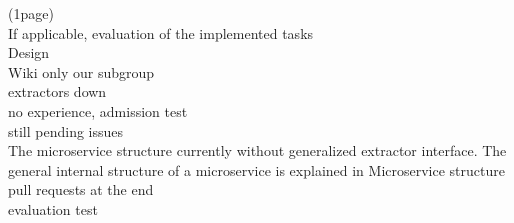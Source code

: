 (1page)\\
If applicable, evaluation of the implemented tasks \\
Design\\
Wiki only our subgroup\\
extractors down\\
no experience, admission test\\
still pending issues\\
The microservice structure currently without generalized extractor interface. The general internal structure of a microservice is explained in Microservice structure\\
pull requests at the end\\
evaluation test\\